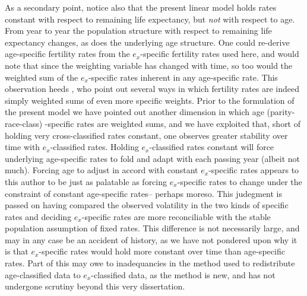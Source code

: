 As a secondary point, notice also that the present linear model holds rates
constant with respect to remaining life expectancy, but \textit{not} with
respect to age. From year to year the population structure with
respect to remaining life expectancy changes, as does the underlying age
structure. One could re-derive age-specific fertility rates from the
$e_x$-specific fertility rates used here, and would note that since the
weighting variable has changed with time, so too would the weighted sum of
the $e_x$-specific rates inherent in any age-specific rate. This observation
heeds \citet{stolnitz1949recent}, who point out several ways in which
fertility rates are indeed simply weighted sums of even more specific weights.
Prior to the formulation of the present model we have pointed out another
dimension in which age (parity-race-class) -specific rates are weighted sums, and we have exploited
that, short of holding very cross-classified rates constant, one observes
greater stability over time with $e_x$-classified rates. Holding
$e_x$-classified rates constant will force underlying age-specific rates to fold
and adapt with each passing year (albeit not much). Forcing age to adjust in
accord with constant $e_x$-specific rates appears to this author to be just as
palatable as forcing $e_x$-specific rates to change under the constraint of
constant age-specific rates-- perhaps moreso. This judegment is passed on having
compared the observed volatility in the two kinds of specific rates and deciding
$e_x$-specific rates are more reconciliable with the stable population
assumption of fixed rates. This difference is not necessarily large, and may in
any case be an accident of history, as we have not pondered upon why it is that
$e_x$-specific rates would hold more constant over time than age-specific rates.
Part of this may owe to inadequancies in the method used to redistribute
age-classified data to $e_x$-classified data, as the method is new, and has not
undergone scrutiny beyond this very dissertation.



\subsection{}